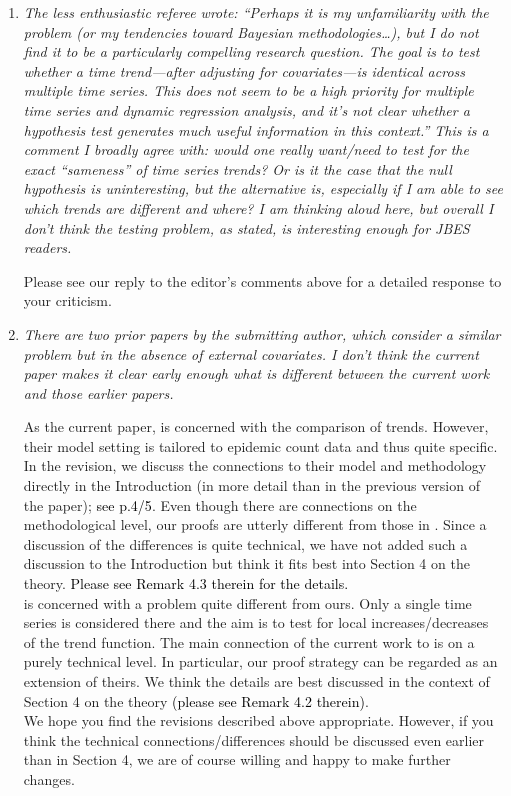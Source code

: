 \documentclass[a4paper,12pt]{article}
\newcommand{\reference}[1]{\textcolor{black}{#1}}
\begin{document}
\begin{enumerate}[label=\arabic*.,leftmargin=0.6cm]


\item \textit{The less enthusiastic referee wrote: “Perhaps it is my unfamiliarity with the problem (or my tendencies toward Bayesian methodologies…), but I do not find it to be a particularly compelling research question. The goal is to test whether a time trend—after adjusting for covariates—is identical across multiple time series. This does not seem to be a high priority for multiple time series and dynamic regression analysis, and it’s not clear whether a hypothesis test generates much useful information in this context.” This is a comment I broadly agree with: would one really want/need to test for the exact “sameness” of time series trends? Or is it the case that the null hypothesis is uninteresting, but the alternative is, especially if I am able to see which trends are different and where? I am thinking aloud here, but overall I don’t think the testing problem, as stated, is interesting enough for JBES readers.}

Please see our reply to the editor's comments above for a detailed response to your criticism. 
  

\item \textit{There are two prior papers by the submitting author, which consider a similar problem but in the absence of external covariates. I don’t think the current paper makes it clear early enough what is different between the current work and those earlier papers.}  

As the current paper, \cite{KhismatullinaVogt2023} is concerned with the comparison of trends. However, their model setting is tailored to epidemic count data and thus quite specific. In the revision, we discuss the connections to their model and methodology directly in the Introduction (in more detail than in the previous version of the paper); \reference{see p.4/5}. Even though there are connections on the methodological level, our proofs are utterly different from those in \cite{KhismatullinaVogt2023}. Since a discussion of the differences is quite technical, we have not added such a discussion to the Introduction but think it fits best into Section 4 on the theory. \reference{Please see Remark 4.3 therein for the details.} \\
\cite{KhismatullinaVogt2020} is concerned with a problem quite different from ours. Only a single time series is considered there and the aim is to test for local increases/decreases of the trend function. The main connection of the current work to \cite{KhismatullinaVogt2020} is on a purely technical level. In particular, our proof strategy can be regarded as an extension of theirs. We think the details are best discussed in the context of Section 4 on the theory \reference{(please see Remark 4.2 therein)}. \\
We hope you find the revisions described above appropriate. However, if you think the technical connections/differences should be discussed even earlier than in Section 4, we are of course willing and happy to make  further changes.  



\end{enumerate}
\end{document}
